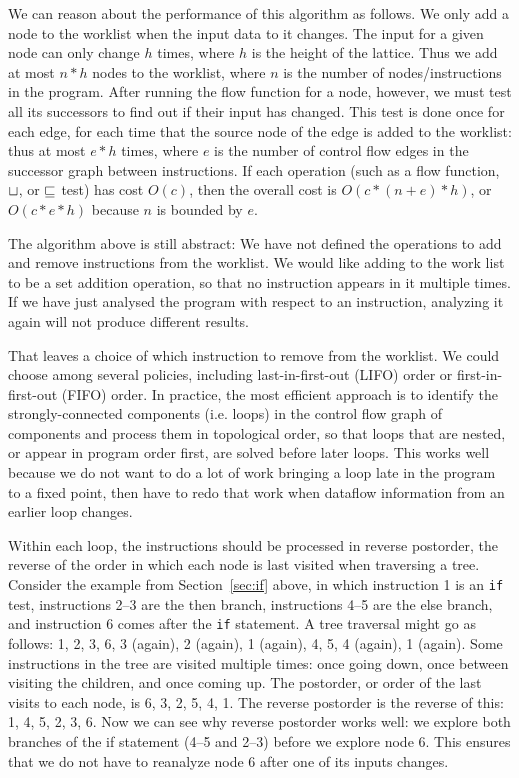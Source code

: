 \documentclass[11pt]{article}
\begin{document}
We can reason about the performance of this algorithm as follows.  We only add
a node to the worklist when the input data to it changes. The
input for a given node can only change $h$ times, where $h$ is the height of the
lattice.  Thus we add at most $n*h$ nodes to the worklist, where $n$ is the
number of nodes/instructions in the program.  After running the flow function for a
node, however, we must test all its successors to find out if their input has
changed.  This test is done once for each edge, for each time that the source
node of the edge is added to the worklist: thus at most $e*h$ times, where $e$
is the number of control flow edges in the successor graph between instructions.
If each operation (such as a flow function, $\sqcup$, or $\sqsubseteq$ test) has cost
$O(c)$, then the overall cost is $O(c * (n+e) * h)$, or $O(c*e*h)$ because $n$
is bounded by $e$.

The algorithm above is still abstract: We have not defined the operations to add
and remove instructions from the worklist.  We would like adding to the work
list to be a set addition operation, so that no instruction appears in it
multiple times.  If we have just analysed the program with respect to an
instruction, analyzing it again will not produce different results.

That leaves a choice of which instruction to remove from the worklist.  We could
choose among several policies, including last-in-first-out (LIFO) order or
first-in-first-out (FIFO) order.  In practice, the most efficient approach is to
identify the strongly-connected components (i.e. loops) in the control flow
graph of components and process them in topological order, so that loops that
are nested, or appear in program order first, are solved before later loops.
This works well because we do not want to do a lot of work bringing a loop late
in the program to a fixed point, then have to redo that work when dataflow
information from an earlier loop changes.

Within each loop, the instructions should be processed in reverse postorder, the
reverse of the order in which each node is last visited when traversing a tree.
Consider the example from Section~\ref{sec:if} above, in which instruction 1 is
an \texttt{if} test, instructions 2--3 are the then branch, instructions 4--5 are
the else branch, and instruction 6 comes after the \texttt{if} statement.  A
tree traversal might go as follows: 1, 2, 3, 6, 3 (again), 2 (again), 1 (again),
4, 5, 4 (again), 1 (again).  Some instructions in the tree are visited multiple
times: once going down, once between visiting the children, and once coming up.
The postorder, or order of the last visits to each node, is 6, 3, 2, 5, 4, 1.
The reverse postorder is the reverse of this: 1, 4, 5, 2, 3, 6.  Now we can see
why reverse postorder works well: we explore both branches of the if statement
(4--5 and 2--3) before we explore node 6.  This ensures that we do not have to
reanalyze node 6 after one of its inputs changes.
\end{document}
